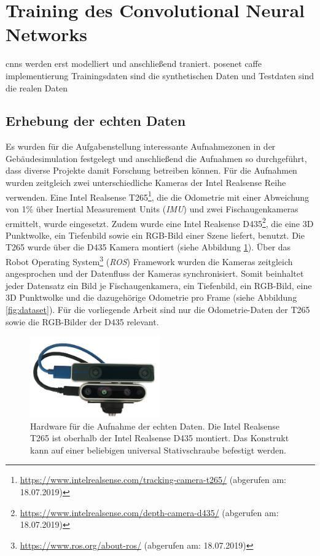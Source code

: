 \newpage
\section{Training des Convolutional Neural Networks}
cnns werden erst modelliert und anschließend traniert.
posenet caffe implementierung
Trainingsdaten sind die synthetischen Daten und Testdaten sind die realen Daten

\subsection{Erhebung der echten Daten}
Es wurden für die Aufgabenstellung interessante Aufnahmezonen in der Gebäudesimulation festgelegt und anschließend die Aufnahmen so durchgeführt, dass diverse Projekte damit Forschung betreiben können.  Für die Aufnahmen wurden zeitgleich zwei unterschiedliche Kameras der Intel Realsense Reihe verwenden. Eine Intel Realsense T265\footnote{\url{https://www.intelrealsense.com/tracking-camera-t265/} (abgerufen am: 18.07.2019)}, die die Odometrie mit einer Abweichung von 1\%  über Inertial Measurement Units (\textit{IMU}) und zwei Fischaugenkameras ermittelt, wurde eingesetzt. Zudem wurde eine Intel Realsense D435\footnote{ \url{https://www.intelrealsense.com/depth-camera-d435/} (abgerufen am: 18.07.2019)}, die eine 3D Punktwolke, ein Tiefenbild sowie ein RGB-Bild einer Szene liefert, benutzt. Die T265 wurde über die D435 Kamera montiert (siehe Abbildung \ref{fig:t265_d435}). Über das Robot Operating System\footnote{\url{https://www.ros.org/about-ros/} (abgerufen am: 18.07.2019)} (\textit{ROS}) Framework wurden die Kameras zeitgleich angesprochen und der Datenfluss der Kameras synchronisiert. Somit beinhaltet jeder Datensatz ein Bild je Fischaugenkamera, ein Tiefenbild, ein RGB-Bild, eine 3D Punktwolke und die dazugehörige Odometrie pro Frame (siehe Abbildung \ref{fig:dataset}). Für die vorliegende Arbeit sind nur die Odometrie-Daten der T265 sowie die RGB-Bilder der D435 relevant.


\begin{figure}[htp]
	\centering
	\includegraphics[width=0.5\textwidth]{images/dataset/t265_d435_2.png}
	\caption{Hardware für die Aufnahme der echten Daten. Die Intel Realsense T265 ist oberhalb der Intel Realsense D435 montiert. Das Konstrukt kann auf einer beliebigen universal Stativschraube befestigt werden.  }
	\label{fig:t265_d435}
\end{figure}


